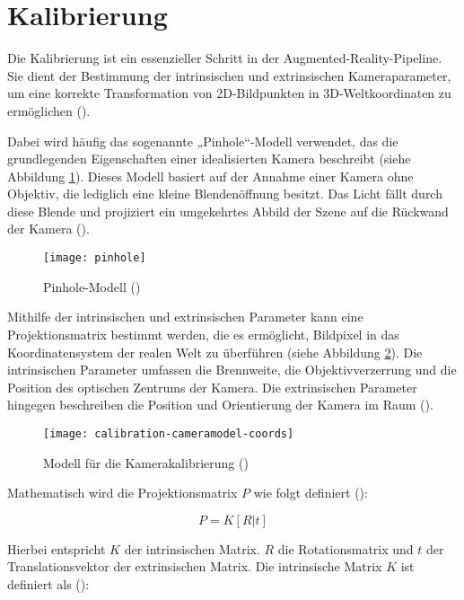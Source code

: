 \section{Kalibrierung}\label{Kalibrierung}

Die Kalibrierung ist ein essenzieller Schritt in der Augmented-Reality-Pipeline. Sie dient der Bestimmung der intrinsischen und extrinsischen Kameraparameter, um eine korrekte Transformation von 2D-Bildpunkten in 3D-Weltkoordinaten zu ermöglichen (\cite{mw2024calibration}).

Dabei wird häufig das sogenannte „Pinhole“-Modell verwendet, das die grundlegenden Eigenschaften einer idealisierten Kamera beschreibt (siehe Abbildung \ref{fig:Pinhole}). Dieses Modell basiert auf der Annahme einer Kamera ohne Objektiv, die lediglich eine kleine Blendenöffnung besitzt. Das Licht fällt durch diese Blende und projiziert ein umgekehrtes Abbild der Szene auf die Rückwand der Kamera (\cite{mw2024calibration}).

\begin{figure}
    \centering
    \texttt{[image: pinhole]}
    \caption{Pinhole-Modell (\cite{mw2024calibration})\label{fig:Pinhole}}\par
\end{figure}

Mithilfe der intrinsischen und extrinsischen Parameter kann eine Projektionsmatrix bestimmt werden, die es ermöglicht, Bildpixel in das Koordinatensystem der realen Welt zu überführen (siehe Abbildung \ref{fig:Kalibrierung}). Die intrinsischen Parameter umfassen die Brennweite, die Objektivverzerrung und die Position des optischen Zentrums der Kamera. Die extrinsischen Parameter hingegen beschreiben die Position und Orientierung der Kamera im Raum (\cite{mw2024calibration}).

\begin{figure}
    \centering
    \texttt{[image: calibration-cameramodel-coords]}
    \caption{Modell für die Kamerakalibrierung (\cite{mw2024calibration})\label{fig:Kalibrierung}}\par
\end{figure}

Mathematisch wird die Projektionsmatrix \(P\) wie folgt definiert (\cite{mw2024calibration, szeliski2022computerVision}):

\[
P = K[R|t]
\]

Hierbei entspricht \(K\) der intrinsischen Matrix. \(R\) die Rotationsmatrix und \(t\) der Translationsvektor der extrinsischen Matrix. Die intrinsische Matrix \(K\) ist definiert als (\cite{mw2024calibration}):

